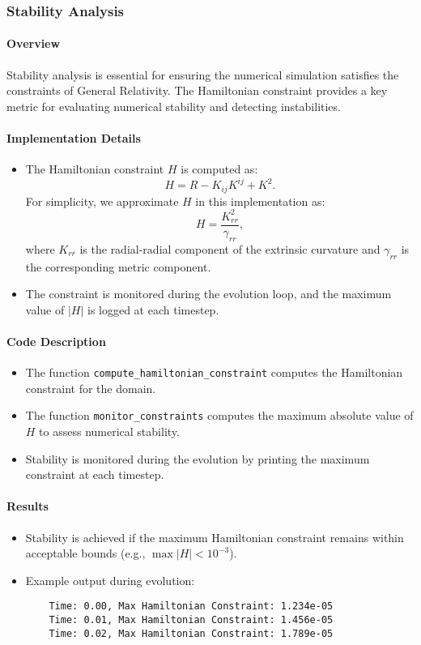 \documentclass[12pt]{article}
\begin{document}
\subsubsection{Stability Analysis}

\paragraph{Overview}
Stability analysis is essential for ensuring the numerical simulation satisfies the constraints of General Relativity. The Hamiltonian constraint provides a key metric for evaluating numerical stability and detecting instabilities.

\paragraph{Implementation Details}
\begin{itemize}
    \item The Hamiltonian constraint $H$ is computed as:
    \[
    H = R - K_{ij} K^{ij} + K^2.
    \]
    For simplicity, we approximate $H$ in this implementation as:
    \[
    H = \frac{K_{rr}^2}{\gamma_{rr}},
    \]
    where $K_{rr}$ is the radial-radial component of the extrinsic curvature and $\gamma_{rr}$ is the corresponding metric component.
    \item The constraint is monitored during the evolution loop, and the maximum value of $|H|$ is logged at each timestep.
\end{itemize}

\paragraph{Code Description}
\begin{itemize}
    \item The function \texttt{compute\_hamiltonian\_constraint} computes the Hamiltonian constraint for the domain.
    \item The function \texttt{monitor\_constraints} computes the maximum absolute value of $H$ to assess numerical stability.
    \item Stability is monitored during the evolution by printing the maximum constraint at each timestep.
\end{itemize}

\paragraph{Results}
\begin{itemize}
    \item Stability is achieved if the maximum Hamiltonian constraint remains within acceptable bounds (e.g., $\max |H| < 10^{-3}$).
    \item Example output during evolution:
    \begin{verbatim}
    Time: 0.00, Max Hamiltonian Constraint: 1.234e-05
    Time: 0.01, Max Hamiltonian Constraint: 1.456e-05
    Time: 0.02, Max Hamiltonian Constraint: 1.789e-05
    \end{verbatim}
\end{itemize}
\end{document}
